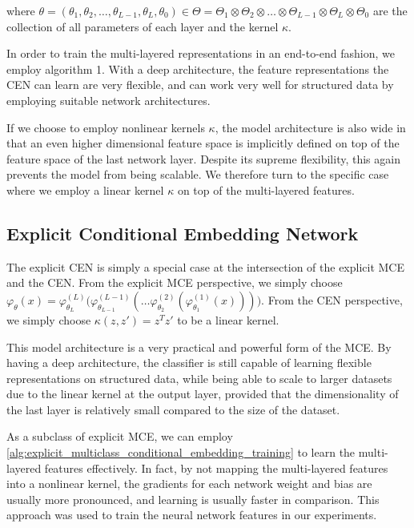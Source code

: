 \documentclass{llncs}
\numberwithin{equation}{section}
\numberwithin{table}{section}
\numberwithin{algorithm}{section}
\begin{document}
	where $\theta = (\theta_{1}, \theta_{2}, \dots, \theta_{L -1}, \theta_{L}, \theta_{0}) \in \Theta = \Theta_{1} \otimes \Theta_{2} \otimes \dots \otimes \Theta_{L - 1} \otimes \Theta_{L} \otimes \Theta_{0}$ are the collection of all parameters of each layer and the kernel $\kappa$.
	
	In order to train the multi-layered representations in an end-to-end fashion, we employ algorithm 1. With a deep architecture, the feature representations the \gls{CEN} can learn are very flexible, and can work very well for structured data by employing suitable network architectures.
	
	If we choose to employ nonlinear kernels $\kappa$, the model architecture is also wide in that an even higher dimensional feature space is implicitly defined on top of the feature space of the last network layer. Despite its supreme flexibility, this again prevents the model from being scalable. We therefore turn to the specific case where we employ a linear kernel $\kappa$ on top of the multi-layered features.
	
	\subsection{Explicit Conditional Embedding Network}
	\label{app:explicit_conditional_embedding_network}
	
	The explicit \gls{CEN} is simply a special case at the intersection of the explicit \gls{MCE} and the \gls{CEN}. From the explicit \gls{MCE} perspective, we simply choose $\varphi_{\theta}(x) = \varphi^{(L)}_{\theta_{L}}\big(\varphi^{(L - 1)}_{\theta_{L - 1}}(\dots\varphi^{(2)}_{\theta_{2}}(\varphi^{(1)}_{\theta_{1}}(x)))\big)$. From the \gls{CEN} perspective, we simply choose $\kappa(z, z') = z^{T} z'$ to be a linear kernel.
	
	This model architecture is a very practical and powerful form of the \gls{MCE}. By having a deep architecture, the classifier is still capable of learning flexible representations on structured data, while being able to scale to larger datasets due to the linear kernel at the output layer, provided that the dimensionality of the last layer is relatively small compared to the size of the dataset.
	
	As a subclass of explicit \gls{MCE}, we can employ \cref{alg:explicit_multiclass_conditional_embedding_training} to learn the multi-layered features effectively. In fact, by not mapping the multi-layered features into a nonlinear kernel, the gradients for each network weight and bias are usually more pronounced, and learning is usually faster in comparison. This approach was used to train the neural network features in our experiments.
	
	
	
	
\end{document}
